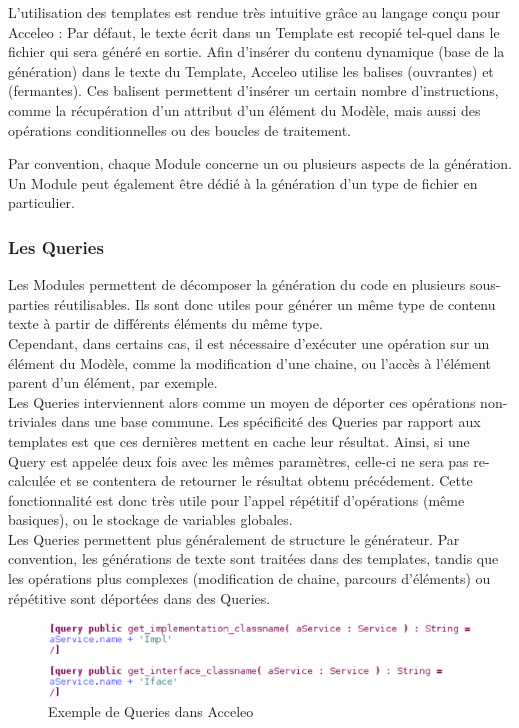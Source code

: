 L'utilisation des templates est rendue très intuitive grâce au langage conçu pour Acceleo : Par défaut, le texte écrit dans un Template est recopié tel-quel dans le fichier qui sera généré en sortie. Afin d'insérer du contenu dynamique (base de la génération) dans le texte du Template, Acceleo utilise les balises \guim{\textbf{[}} (ouvrantes) et \guim{\textbf{/]}} (fermantes). Ces balisent permettent d'insérer un certain nombre d'instructions, comme la récupération d'un attribut d'un élément du Modèle, mais aussi des opérations conditionnelles ou des boucles de traitement.

Par convention, chaque Module concerne un ou plusieurs aspects de la génération. Un Module peut également être dédié à la génération d'un type de fichier en particulier.



\subsubsection{Les Queries}

Les Modules permettent de décomposer la génération du code en plusieurs sous-parties réutilisables. Ils sont donc utiles pour générer un même type de contenu texte à partir de différents éléments du même type.\\
Cependant, dans certains cas, il est nécessaire d'exécuter une opération sur un élément du Modèle, comme la modification d'une chaine, ou l'accès à l'élément parent d'un élément, par exemple.\\
Les Queries interviennent alors comme un moyen de déporter ces opérations non-triviales dans une base commune. Les spécificité des Queries par rapport aux templates est que ces dernières mettent en cache leur résultat. Ainsi, si une Query est appelée deux fois avec les mêmes paramètres, celle-ci ne sera pas re-calculée et se contentera de retourner le résultat obtenu précédement. Cette fonctionnalité est donc très utile pour l'appel répétitif d'opérations (même basiques), ou le stockage de variables globales.\\
Les Queries permettent plus généralement de structure le générateur. Par convention, les générations de texte sont traitées dans des templates, tandis que les opérations plus complexes (modification de chaine, parcours d'éléments) ou répétitive sont déportées dans des Queries.

\begin{figure}[htb]
  \centering
  \includegraphics[scale=0.6]{img/screen_query.eps}
  \caption{Exemple de Queries dans Acceleo}
  \label{fig:acc_module}
\end{figure}

